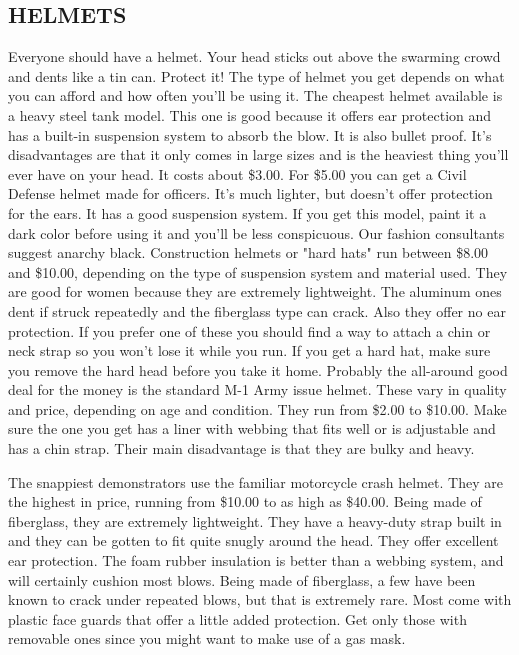 \documentclass[11pt,twoside,a4paper]{book}
\begin{document}
\subsection{HELMETS}

Everyone should have a helmet. Your head sticks out above the swarming crowd and dents like a tin can. Protect it! The type of helmet you get depends on what you can afford and how often you'll be using it. The cheapest helmet available is a heavy steel tank model. This one is good because it offers ear protection and has a built-in suspension system to absorb the blow. It is also bullet proof. It's disadvantages are that it only comes in large sizes and is the heaviest thing you'll ever have on your head. It costs about \$3.00. For \$5.00 you can get a Civil Defense helmet made for officers. It's much lighter, but doesn't offer protection for the ears. It has a good suspension system. If you get this model, paint it a dark color before using it and you'll be less conspicuous. Our fashion consultants suggest anarchy black. Construction helmets or "hard hats" run between \$8.00 and \$10.00, depending on the type of suspension system and material used. They are good for women because they are extremely lightweight. The aluminum ones dent if struck repeatedly and the fiberglass type can crack. Also they offer no ear protection. If you prefer one of these you should find a way to attach a chin or neck strap so you won't lose it while you run. If you get a hard hat, make sure you remove the hard head before you take it home. Probably the all-around good deal for the money is the standard M-1 Army issue helmet. These vary in quality and price, depending on age and condition.  They run from \$2.00 to \$10.00. Make sure the one you get has a liner with webbing that fits well or is adjustable and has a chin strap. Their main disadvantage is that they are bulky and heavy.

The snappiest demonstrators use the familiar motorcycle crash helmet. They are the highest in price, running from \$10.00 to as high as \$40.00. Being made of fiberglass, they are extremely lightweight. They have a heavy-duty strap built in and they can be gotten to fit quite snugly around the head. They offer excellent ear protection. The foam rubber insulation is better than a webbing system, and will certainly cushion most blows. Being made of fiberglass, a few have been known to crack under repeated blows, but that is extremely rare. Most come with plastic face guards that offer a little added protection. Get only those with removable ones since you might want to make use of a gas mask. 
\end{document}
